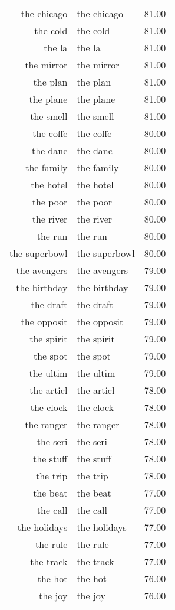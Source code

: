 \begin{table}[ht]
\begin{tabular}{rlr}
  the chicago & the chicago & 81.00 \\ 
  the cold & the cold & 81.00 \\ 
  the la & the la & 81.00 \\ 
  the mirror & the mirror & 81.00 \\ 
  the plan & the plan & 81.00 \\ 
  the plane & the plane & 81.00 \\ 
  the smell & the smell & 81.00 \\ 
  the coffe & the coffe & 80.00 \\ 
  the danc & the danc & 80.00 \\ 
  the family & the family & 80.00 \\ 
  the hotel & the hotel & 80.00 \\ 
  the poor & the poor & 80.00 \\ 
  the river & the river & 80.00 \\ 
  the run & the run & 80.00 \\ 
  the superbowl & the superbowl & 80.00 \\ 
  the avengers & the avengers & 79.00 \\ 
  the birthday & the birthday & 79.00 \\ 
  the draft & the draft & 79.00 \\ 
  the opposit & the opposit & 79.00 \\ 
  the spirit & the spirit & 79.00 \\ 
  the spot & the spot & 79.00 \\ 
  the ultim & the ultim & 79.00 \\ 
  the articl & the articl & 78.00 \\ 
  the clock & the clock & 78.00 \\ 
  the ranger & the ranger & 78.00 \\ 
  the seri & the seri & 78.00 \\ 
  the stuff & the stuff & 78.00 \\ 
  the trip & the trip & 78.00 \\ 
  the beat & the beat & 77.00 \\ 
  the call & the call & 77.00 \\ 
  the holidays & the holidays & 77.00 \\ 
  the rule & the rule & 77.00 \\ 
  the track & the track & 77.00 \\ 
  the hot & the hot & 76.00 \\ 
  the joy & the joy & 76.00 \\ 

\end{tabular}
\end{table}
